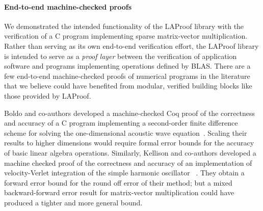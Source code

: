 \paragraph*{End-to-end machine-checked proofs} We demonstrated the intended
functionality of the LAProof library with the verification of a C program
implementing sparse matrix-vector multiplication. Rather than serving as its own
end-to-end verification effort, the LAProof library is intended to serve as a
\emph{proof layer} between the verification of application software and programs
implementing operations defined by BLAS. There are a few end-to-end
machine-checked proofs of numerical programs in the literature that we believe
could have benefited from modular, verified building blocks like those provided
by LAProof.

Boldo and co-authors developed a machine-checked Coq proof of the correctness
and accuracy of a C program implementing a second-order finite difference scheme
for solving the one-dimensional acoustic wave equation~\cite{boldo2014}.
Scaling their results to higher dimensions would require formal error bounds for
the accuracy of basic linear algebra operations. Similarly, Kellison and
co-authors developed a machine checked proof of the correctness and accuracy of
an implementation of velocity-Verlet integration of the simple harmonic
oscillator~ \cite{kellison2022}. They obtain a forward error bound for the round
off error of their method; but a mixed backward-forward error result for
matrix-vector multiplication could have produced a tighter and more general
bound.
